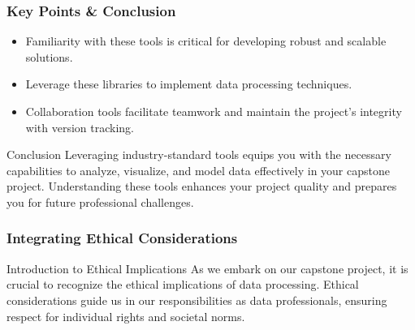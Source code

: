\documentclass[aspectratio=169]{beamer}
\begin{document}
\begin{frame}
    \frametitle{Key Points \& Conclusion}
    \begin{itemize}
        \item Familiarity with these tools is critical for developing robust and scalable solutions.
        \item Leverage these libraries to implement data processing techniques.
        \item Collaboration tools facilitate teamwork and maintain the project's integrity with version tracking.
    \end{itemize}
    \begin{block}{Conclusion}
        Leveraging industry-standard tools equips you with the necessary capabilities to analyze, visualize, and model data effectively in your capstone project. Understanding these tools enhances your project quality and prepares you for future professional challenges.
    \end{block}
\end{frame}

\begin{frame}[fragile]
    \frametitle{Integrating Ethical Considerations}
    \begin{block}{Introduction to Ethical Implications}
        As we embark on our capstone project, it is crucial to recognize the ethical implications of data processing. Ethical considerations guide us in our responsibilities as data professionals, ensuring respect for individual rights and societal norms.
    \end{block}
\end{frame}
\end{document}
